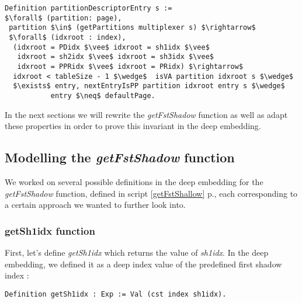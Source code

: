 \begin{itemize}
\begin{lstlisting}[caption={partitionDescriptorEntry property},mathescape=true, xleftmargin=-.05\textwidth,label={descrip}]
Definition partitionDescriptorEntry s := 
$\forall$ (partition: page),  
 partition $\in$ (getPartitions multiplexer s) $\rightarrow$ 
 $\forall$ (idxroot : index), 
  (idxroot = PDidx $\vee$ idxroot = sh1idx $\vee$ 
   idxroot = sh2idx $\vee$ idxroot = sh3idx $\vee$ 
   idxroot = PPRidx $\vee$ idxroot = PRidx) $\rightarrow$
  idxroot < tableSize - 1 $\wedge$  isVA partition idxroot s $\wedge$  
  $\exists$ entry, nextEntryIsPP partition idxroot entry s $\wedge$  
           entry $\neq$ defaultPage.
\end{lstlisting} 
\vspace{4pt}	
\end{itemize}
In the next sections we will rewrite the \textit{getFstShadow} function as well as adapt these properties in order to prove this invariant in the deep embedding.


\subsection{Modelling the \textit{getFstShadow} function}
We worked on several possible definitions in the deep embedding for the \textit{getFstShadow} function, defined in script \ref{getFstShallow} p.\pageref{getFstShallow}, each corresponding to a certain approach we wanted to further look into.

\subsubsection{getSh1idx function} 
First, let's define \textit{getSh1idx} which returns the value of \textit{sh1idx}. In the deep embedding, we defined it as a deep index value of the predefined first shadow index :
\begin{lstlisting}[caption = {getSh1idx definition  in the deep embedding},xleftmargin=.02\textwidth,
xrightmargin=.02\textwidth]
Definition getSh1idx : Exp := Val (cst index sh1idx).
\end{lstlisting} 
